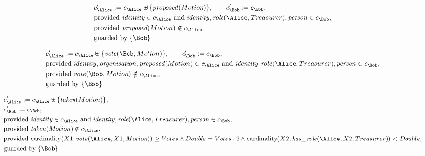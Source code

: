 \begin{align*}
&
c'_
{
\Alice
}
 := 
c_
{
\Alice
}
 \uplus 
\{
\mathit{\detokenize{
proposed
}}
(
Motion
)
\}
, \qquad 
c'_
{
\Bob
}
 := 
c_
{
\Bob
}
,\\
&
\text{provided } 
\mathit{\detokenize{
identity
}}
 \in c_
{
\Alice
}
 \text{ and } 
\mathit{\detokenize{
identity
}}
,
\mathit{\detokenize{
role
}}
(
\Alice
,
Treasurer
)
,
\mathit{\detokenize{
person
}}
 \in c_
{
\Bob
}
,\\
&
\text{provided } 
\mathit{\detokenize{
proposed
}}
(
Motion
)
 \notin c_
{
\Alice
}
,\\
&
\text{guarded by } \{
\Bob
\}
\end{align*}

\begin{align*}
&
c'_
{
\Alice
}
 := 
c_
{
\Alice
}
 \uplus 
\{
\mathit{\detokenize{
vote
}}
(
\Bob
,
Motion
)
\}
, \qquad 
c'_
{
\Bob
}
 := 
c_
{
\Bob
}
,\\
&
\text{provided } 
\mathit{\detokenize{
identity
}}
,
\mathit{\detokenize{
organisation
}}
,
\mathit{\detokenize{
proposed
}}
(
Motion
)
 \in c_
{
\Alice
}
 \text{ and } 
\mathit{\detokenize{
identity
}}
,
\mathit{\detokenize{
role
}}
(
\Alice
,
Treasurer
)
,
\mathit{\detokenize{
person
}}
 \in c_
{
\Bob
}
,\\
&
\text{provided } 
\mathit{\detokenize{
vote
}}
(
\Bob
,
Motion
)
 \notin c_
{
\Alice
}
,\\
&
\text{guarded by } \{
\Bob
\}
\end{align*}

\begin{align*}
&
c'_
{
\Alice
}
 := 
c_
{
\Alice
}
 \uplus 
\{
\mathit{\detokenize{
taken
}}
(
Motion
)
\}
,\\
&
c'_
{
\Bob
}
 := 
c_
{
\Bob
}
,\\
&
\text{provided } 
\mathit{\detokenize{
identity
}}
 \in c_
{
\Alice
}
 \text{ and } 
\mathit{\detokenize{
identity
}}
,
\mathit{\detokenize{
role
}}
(
\Alice
,
Treasurer
)
,
\mathit{\detokenize{
person
}}
 \in c_
{
\Bob
}
,\\
&
\text{provided } 
\mathit{\detokenize{
taken
}}
(
Motion
)
 \notin c_
{
\Alice
}
,\\
&
\text{provided } 
\mathrm{cardinality}(
X1
,
\mathit{\detokenize{
vote
}}
(
\Alice
,
X1
,
Motion
)
)
\ge
Votes
\land
Double
=
Votes
\cdot
2
\land
\mathrm{cardinality}(
X2
,
\mathit{\detokenize{
has_role
}}
(
\Alice
,
X2
,
Treasurer
)
)
<
Double
,\\
&
\text{guarded by } \{
\Bob
\}
\end{align*}
